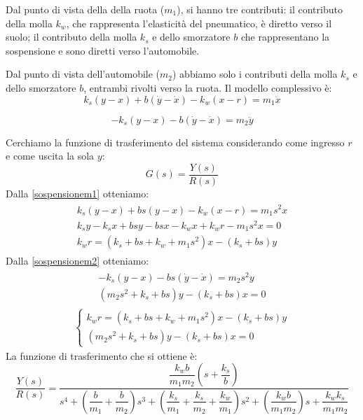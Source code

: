 \documentclass[a4paper]{report}
\begin{document}
Dal punto di vista della della ruota ($m_1$), si hanno tre contributi:
il contributo della molla $k_w$, che rappresenta l'elasticit\`a del
pneumatico, \`e diretto verso il suolo; il contributo della molla
$k_s$ e dello smorzatore $b$ che rappresentano la sospensione e sono
diretti verso l'automobile.

Dal punto di vista dell'automobile ($m_2$) abbiamo solo i contributi
della molla $k_s$ e dello smorzatore $b$, entrambi rivolti verso la ruota.
Il modello complessivo \`e:
\begin{equation}\label{sospensionem1}
  k_s(y-x) + b(\dot{y} - \dot{x}) - k_w(x-r) = m_1\ddot{x}
\end{equation}

\begin{equation}\label{sospensionem2}
  -k_s(y-x) -b(\dot{y} - \dot{x}) = m_2 \ddot{y}
\end{equation}

Cerchiamo la funzione di trasferimento del sistema considerando come
ingresso $r$ e come uscita la sola $y$:
$$G(s) = \frac{Y(s)}{R(s)}$$
Dalla \ref{sospensionem1} otteniamo:
\begin{eqnarray*}
  \begin{array}{l}
    k_s(y-x) + bs(y-x) - k_w(x-r) = m_1s^2x\\
    k_sy - k_sx + bsy - bsx - k_wx + k_wr - m_1s^2x = 0\\
    k_wr = (k_s + bs + k_w + m_1s^2)x - (k_s +bs)y
  \end{array}
\end{eqnarray*}
Dalla \ref{sospensionem2} otteniamo:
\begin{eqnarray*}
  \begin{array}{l}
    -k_s(y-x) -  bs(\dot{y} - \dot{x}) = m_2s^2y\\
    (m_2 s^2 +k_s +bs)y - (k_s + bs)x = 0
  \end{array}
\end{eqnarray*}
\begin{eqnarray*}
  \left\{ \begin{array}{l}
    k_wr = (k_s + bs + k_w + m_1s^2)x - (k_s +bs)y\\
    (m_2 s^2 +k_s +bs)y - (k_s + bs)x = 0
    \end{array}\right .
\end{eqnarray*}
La funzione di trasferimento che si ottiene \`e:
$$\dfrac{Y(s)}{R(s)} = \dfrac{\dfrac{k_wb}{m_1m_2} \left( s +
  \dfrac{k_s}{b}\right)}{s^4 + \left( \dfrac{b}{m_1} +
  \dfrac{b}{m_2}\right)s^3 + \left( \dfrac{k_s}{m_1} +
  \dfrac{k_s}{m_2} + \dfrac{k_w}{m_1}\right)s^2 + \left( \dfrac{k_w
  b}{m_1 m_2}\right)s + \dfrac{k_w k_s}{m_1 m_2}}$$
\end{document}
